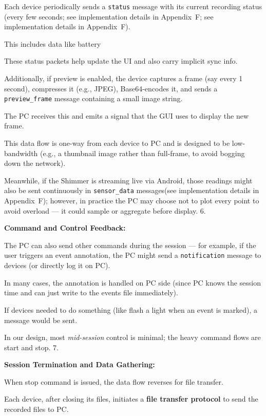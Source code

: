 Each device periodically sends a \texttt{status} message with its current recording status (every few seconds; see implementation details in Appendix~F; see implementation details in Appendix~F).

This includes data like battery %

These status packets help update the UI and also carry implicit sync info.

Additionally, if preview is enabled, the device captures a frame (say every 1 second), compresses it (e.g., JPEG), Base64-encodes it, and sends a \texttt{preview\_frame} message containing a small image string.

The PC receives this and emits a signal that the GUI uses to display the new frame.

This data flow is one-way from each device to PC and is designed to be low-bandwidth (e.g., a thumbnail image rather than full-frame, to avoid bogging down the network).

Meanwhile, if the Shimmer is streaming live via Android, those readings might also be sent continuously in \texttt{sensor\_data} messages(see implementation details in Appendix~F); however, in practice the PC may choose not to plot every point to avoid overload --- it could sample or aggregate before display. 6.

\textbf{Command and Control Feedback:}

The PC can also send other commands during the session --- for example, if the user triggers an event annotation, the PC might send a \texttt{notification} message to devices (or directly log it on PC).

In many cases, the annotation is handled on PC side (since PC knows the session time and can just write to the events file immediately).

If devices needed to do something (like flash a light when an event is marked), a message would be sent.

In our design, most \textit{mid-session} control is minimal; the heavy command flows are start and stop. 7.

\textbf{Session Termination and Data Gathering:}

When stop command is issued, the data flow reverses for file transfer.

Each device, after closing its files, initiates a \textbf{file transfer protocol}
 to send the recorded files to PC.


